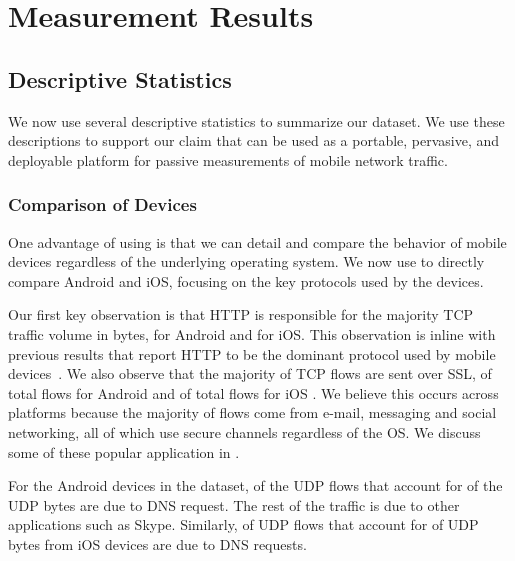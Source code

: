 \section{Measurement Results}
\label{sec:measurements}


\subsection{Descriptive Statistics}  

We now use several descriptive statistics to summarize our \moball dataset.
We use these descriptions to support our claim that \platname can be used as a portable, pervasive, and deployable platform for passive measurements of mobile network traffic. 

\subsubsection{Comparison of Devices} 
One advantage of using \platname is that we can detail and compare the behavior of mobile devices regardless of the underlying operating system. 
We now use  to directly compare Android and iOS, focusing on the key protocols used by the devices. 

Our first key observation is that HTTP is responsible for the majority TCP traffic volume in bytes,  for Android and  for iOS. 
This observation is inline with previous results that report HTTP to be the dominant protocol used by mobile devices~\cite{falaki:mobileusage, maier:mobtraffic}. 
We also observe that the majority of TCP flows are sent over SSL,   of total flows for Android and  of total flows for iOS . 
We believe this occurs across platforms because the majority of flows come from e-mail, messaging and social networking, all of which use secure channels regardless of the OS. 
We discuss some of these popular application in .

For the Android devices in the \moball dataset,  of the UDP flows that account for  of the UDP bytes are due to DNS request. 
The rest of the traffic is due to other applications such as Skype. 
Similarly,  of UDP flows that account for  of UDP bytes from iOS devices are due to DNS requests. 

